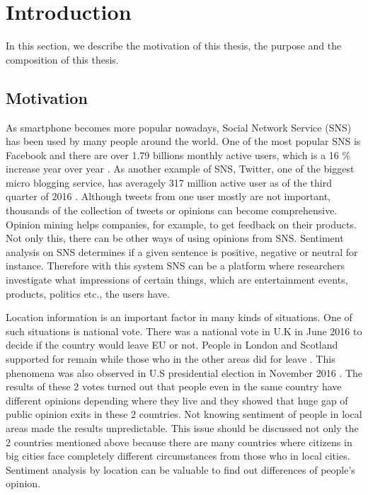 \chapter{Introduction}
In this section, we describe the motivation of this thesis, the purpose and the composition of this thesis.

\section{Motivation} \label{sec:motivation}
As smartphone becomes more popular nowadays, Social Network Service (SNS) has been used by many people around the world.
One of the most popular SNS is Facebook and there are over 1.79 billions monthly active users, which is a 16 \% increase year over year \cite{facebook_user}.
As another example of SNS, Twitter, one of the biggest micro blogging service, has averagely 317 million active user as of the third quarter of 2016 \cite{twitter_user}.
Although tweets from one user mostly are not important, thousands of the collection of tweets or opinions can become comprehensive.
Opinion mining helps companies, for example, to get feedback on their products.
Not only this, there can be other ways of using opinions from SNS.
Sentiment analysis on SNS determines if a given sentence is positive, negative or neutral for instance.
Therefore with this system SNS can be a platform where researchers investigate what impressions of certain things, which are entertainment events, products, politics etc., the users have.


Location information is an important factor in many kinds of situations.
One of such situations is national vote.
There was a national vote in U.K in June 2016 to decide if the country would leave EU or not.
People in London and Scotland supported for remain while those who in the other areas did for leave \cite{uk_referendum}.
This phenomena was also observed in U.S presidential election in November 2016 \cite{us_map}.
The results of these 2 votes turned out that people even in the same country have different opinions depending where they live and they showed that huge gap of public opinion exits in these 2 countries.
Not knowing sentiment of people in local areas made the results unpredictable.
This issue should be discussed not only the 2 countries mentioned above because there are many countries where citizens in big cities face completely different circumstances from those who in local cities.
Sentiment analysis by location can be valuable to find out differences of people's opinion. 

